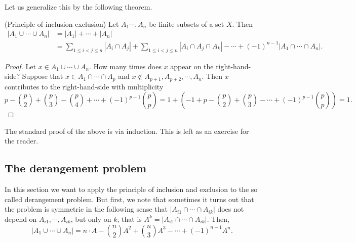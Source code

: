 Let us generalize this by the following theorem.

\begin{theorem}(Principle of inclusion-exclusion)
Let $A_1\cdots, A_n$ be finite subsets of a set $X$. Then 
\begin{align*}
|A_1 \cup \cdots \cup A_n|&=|A_1|+\cdots+|A_n|\\
&=\sum_{1 \leq i < j \leq n} |A_i \cap A_j|+\sum_{1 \leq i < j \leq n} |A_i \cap A_j \cap A_k| - \cdots + (-1)^{n-1}|A_1 \cap \cdots \cap A_n|.
\end{align*}
\end{theorem}

\begin{proof}
Let $x \in A_1 \cup \cdots \cup A_n$. How many times does $x$ appear on the right-hand-side? Suppose that $x \in A_1 \cap \cdots \cap A_p$ and 
$x \notin A_{p+1}, A_{p+2}, \cdots, A_n$. Then $x$ contributes to the right-hand-side with multiplicity 
$$
p- {p \choose 2} + {p \choose 3} - {p \choose 4} + \cdots + (-1)^{p-1} {p \choose p}=1+(-1 +p- {p \choose 2} + {p \choose 3} - \cdots + (-1)^{p-1} {p \choose p})=1.
$$
\end{proof}

The standard proof of the above is via induction. This is left as an exercise for the reader.

\subsection{The derangement problem}

In this section we want to apply the principle of inclusion and exclusion to the so called derangement problem. But first, we note that sometimes it turns out that the 
problem is symmetric in the following sense that $|A_{i1} \cap \cdots \cap A_{ik}|$ does not depend on $A_{i1}, \cdots, A_{ik}$, but only on $k$, that is $A^k=|A_{i1} \cap \cdots \cap A_{ik}|$. 
Then, 
$$
|A_1 \cup \cdots \cup A_n|=n \cdot A - {n \choose 2} A^2 + {n \choose 3} A^3 - \cdots + (-1)^{n-1} A^n.
$$


